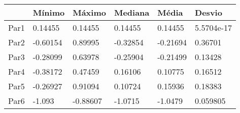 \begin{tabular}{llllll}
& Mínimo & Máximo & Mediana & Média & Desvio \\ 
\hline 
Par1 & 0.14455 & 0.14455 & 0.14455 & 0.14455 & 5.5704e-17 \\ 
Par2 & -0.60154 & 0.89995 & -0.32854 & -0.21694 & 0.36701 \\ 
Par3 & -0.28099 & 0.63978 & -0.25904 & -0.21499 & 0.13428 \\ 
Par4 & -0.38172 & 0.47459 & 0.16106 & 0.10775 & 0.16512 \\ 
Par5 & -0.26927 & 0.91094 & 0.10724 & 0.15936 & 0.18383 \\ 
Par6 & -1.093 & -0.88607 & -1.0715 & -1.0479 & 0.059805 \\ 
\hline 
\end{tabular}